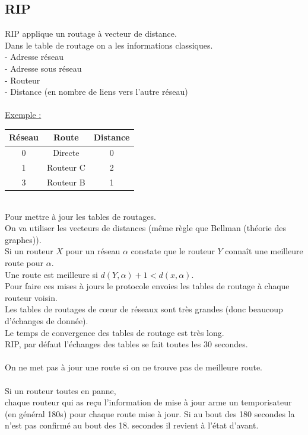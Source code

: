 \documentclass{article}
\begin{document}
\subsection{RIP}
RIP applique un routage à vecteur de distance.
\\
Dans le table de routage on a les informations classiques. \\
- Adresse réseau \\
- Adresse sous réseau \\
- Routeur \\
- Distance (en nombre de liens vers l'autre réseau) \\
\\
\underline{Exemple : } \\
\begin{tabular}{|c|c|c|}
\hline 
\textbf{Réseau}  & \textbf{Route} & \textbf{Distance} \\ 
\hline 
0 & Directe & 0 \\ 
\hline 
1 & Routeur C & 2 \\ 
\hline 
3 & Routeur B & 1 \\ 
\hline 
\end{tabular} \\
Pour mettre à jour les tables de routages. \\
On va utiliser les vecteurs de distances (même règle que Bellman (théorie des graphes)). \\
Si un routeur $X$ pour un réseau $\alpha$ constate que le routeur $Y$ connaît une meilleure route pour $\alpha$. \\
Une route est meilleure si $d(Y,\alpha)+1<d(x,\alpha)$. \\
Pour faire ces mises à jours le protocole envoies les tables de routage à chaque routeur voisin. \\
Les tables de routages de cœur de réseaux sont très grandes (donc beaucoup d'échanges de donnée).\\
Le temps de convergence des tables de routage est très long. \\
RIP, par défaut l'échanges des tables se fait toutes les 30 secondes. \\
\\
On ne met pas à jour une route si on ne trouve pas de meilleure route. \\
\\
Si un routeur toutes en panne, \\
chaque routeur qui as reçu l'information de mise à jour  arme un temporisateur (en général 180s) pour chaque route mise à jour. Si au bout des 180 secondes la n'est pas confirmé au bout des 18. secondes il revient à l'état d'avant.
\end{document}
